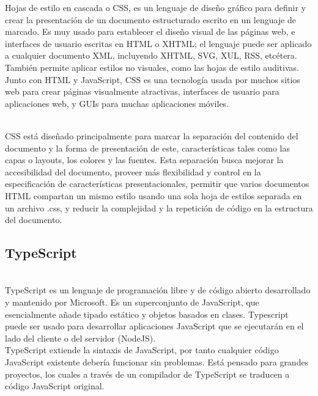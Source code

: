 \documentclass[a4paper, 11pt]{article}
\begin{document}
\begin{itemize}
          Hojas de estilo en cascada o CSS, es un lenguaje de diseño gráfico para
          definir y crear la presentación de un documento estructurado escrito en un
          lenguaje de marcado.​ Es muy usado para establecer el diseño visual de las
          páginas web, e interfaces de usuario escritas en HTML o XHTML; el lenguaje
          puede ser aplicado a cualquier documento XML, incluyendo XHTML, SVG, XUL,
          RSS, etcétera. También permite aplicar estilos no visuales, como las hojas
          de estilo auditivas.\\

          Junto con HTML y JavaScript, CSS es una tecnología usada por muchos sitios
          web para crear páginas visualmente atractivas, interfaces de usuario para
          aplicaciones web, y GUIs para muchas aplicaciones móviles.\\​

          CSS está diseñado principalmente para marcar la separación del contenido
          del documento y la forma de presentación de este, características tales
          como las capas o layouts, los colores y las fuentes. Esta separación
          busca mejorar la accesibilidad del documento, proveer más flexibilidad y
          control en la especificación de características presentacionales, permitir
          que varios documentos HTML compartan un mismo estilo usando una sola hoja
          de estilos separada en un archivo .css, y reducir la complejidad y la
          repetición de código en la estructura del documento.

          \subsection{TypeScript}\\

          TypeScript es un lenguaje de programación libre y de código abierto
          desarrollado y mantenido por Microsoft. Es un superconjunto de JavaScript,
          que esencialmente añade tipado estático y objetos basados en clases.
          Typescript puede ser usado para
          desarrollar aplicaciones JavaScript que se ejecutarán en el lado del
          cliente o del servidor (NodeJS).\\

          TypeScript extiende la sintaxis de JavaScript, por tanto cualquier código
          JavaScript existente debería funcionar sin problemas. Está pensado para
          grandes proyectos, los cuales a través de un compilador de TypeScript se
          traducen a código JavaScript original.\\


\end{itemize}
\end{document}

